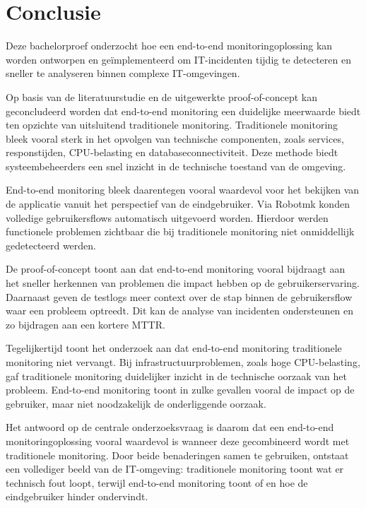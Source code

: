 
\chapter{Conclusie}%
\label{ch:conclusie}

Deze bachelorproef onderzocht hoe een end-to-end monitoringoplossing kan worden ontworpen en geïmplementeerd om IT-incidenten tijdig te detecteren en sneller te analyseren binnen complexe IT-omgevingen.

Op basis van de literatuurstudie en de uitgewerkte proof-of-concept kan geconcludeerd worden dat end-to-end monitoring een duidelijke meerwaarde biedt ten opzichte van uitsluitend traditionele monitoring. Traditionele monitoring bleek vooral sterk in het opvolgen van technische componenten, zoals services, responstijden, CPU-belasting en databaseconnectiviteit. Deze methode biedt systeembeheerders een snel inzicht in de technische toestand van de omgeving.

End-to-end monitoring bleek daarentegen vooral waardevol voor het bekijken van de applicatie vanuit het perspectief van de eindgebruiker. Via Robotmk konden volledige gebruikersflows automatisch uitgevoerd worden. Hierdoor werden functionele problemen zichtbaar die bij traditionele monitoring niet onmiddellijk gedetecteerd werden.

De proof-of-concept toont aan dat end-to-end monitoring vooral bijdraagt aan het sneller herkennen van problemen die impact hebben op de gebruikerservaring. Daarnaast geven de testlogs meer context over de stap binnen de gebruikersflow waar een probleem optreedt. Dit kan de analyse van incidenten ondersteunen en zo bijdragen aan een kortere MTTR.

Tegelijkertijd toont het onderzoek aan dat end-to-end monitoring traditionele monitoring niet vervangt. Bij infrastructuurproblemen, zoals hoge CPU-belasting, gaf traditionele monitoring duidelijker inzicht in de technische oorzaak van het probleem. End-to-end monitoring toont in zulke gevallen vooral de impact op de gebruiker, maar niet noodzakelijk de onderliggende oorzaak.

Het antwoord op de centrale onderzoeksvraag is daarom dat een end-to-end monitoringoplossing vooral waardevol is wanneer deze gecombineerd wordt met traditionele monitoring. Door beide benaderingen samen te gebruiken, ontstaat een vollediger beeld van de IT-omgeving: traditionele monitoring toont wat er technisch fout loopt, terwijl end-to-end monitoring toont of en hoe de eindgebruiker hinder ondervindt.

